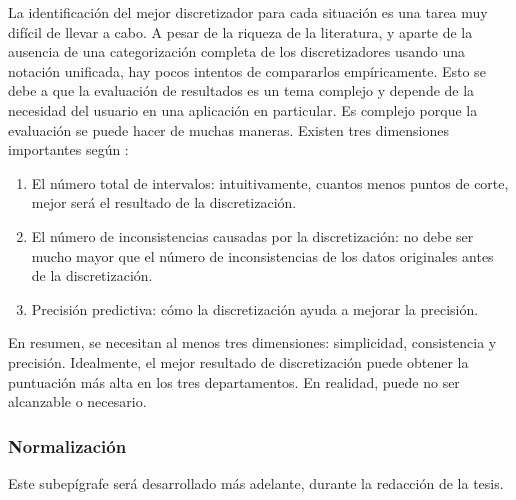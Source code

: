 La identificación del mejor discretizador para cada situación es una tarea muy difícil de llevar a cabo. A pesar de la riqueza de la literatura, y aparte de la ausencia de una categorización completa de los discretizadores usando una notación unificada, hay pocos intentos de compararlos empíricamente. Esto se debe a que la evaluación de resultados es un tema complejo y depende de la necesidad del usuario en una aplicación en particular. Es complejo porque la evaluación se puede hacer de muchas maneras. Existen tres dimensiones importantes según \citep{liu2002discretization}: 
\begin{enumerate}
	\item El número total de intervalos: intuitivamente, cuantos menos puntos de corte, mejor será el resultado de la discretización.
	\item El número de inconsistencias causadas por la discretización: no debe ser mucho mayor que el número de inconsistencias de los datos originales antes de la discretización.
	\item Precisión predictiva: cómo la discretización ayuda a mejorar la precisión.
\end{enumerate}
 En resumen, se necesitan al menos tres dimensiones: simplicidad, consistencia y precisión. Idealmente, el mejor resultado de discretización puede obtener la puntuación más alta en los tres departamentos. En realidad, puede no ser alcanzable o necesario. 
 

\subsubsection*{Normalización}
Este subepígrafe será desarrollado más adelante, durante la redacción de la tesis.

